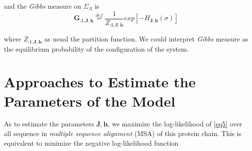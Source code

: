 \documentclass[a4paper,12pt]{article}
\begin{document}
and the \emph{Gibbs} measure on $\Sigma_\Lambda$ is
\begin{equation} \label{eq5}
 \mathbf{G}_{\Lambda,\mathbf{J},\mathbf{h}} \stackrel{def}{=} \frac{1}{Z_{\Lambda,\mathbf{J},\mathbf{h}}} exp \left[ -H_{\mathbf{J},\mathbf{h}}(\sigma) \right] 
\end{equation}
 
 where \(Z_{\Lambda,\mathbf{J},\mathbf{h}}\) as usual the partition function. We could interpret \emph{Gibbs} measure as the equilibrium  probability of the configuration of the system. 
 
\section{Approaches to Estimate the Parameters of the Model}

As to estimate the parameters \(\mathbf{J,h}\), we maximize the log-likelihood of \eqref{eq5} over all sequence in \emph{multiple sequence alignment} (MSA) of this protein chain. This is equivalent to minimize the negative log-likelihood function
\begin{equation} \label{eq6}

\end{equation}



\end{document}

